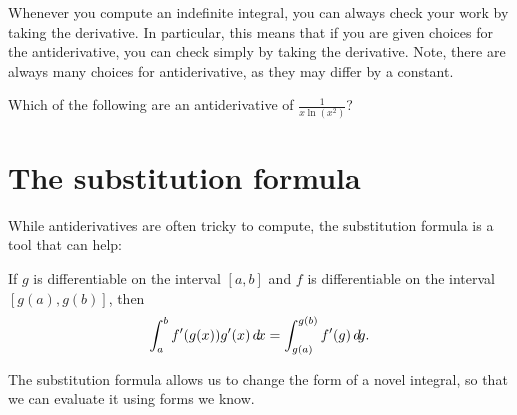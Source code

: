 \documentclass{ximera}
\begin{document}
Whenever you compute an indefinite integral, you can always check your
work by taking the derivative. In particular, this means that if you
are given choices for the antiderivative, you can check simply by
taking the derivative. Note, there are always many choices for
antiderivative, as they may differ by a constant.

\begin{question}
  Which of the following are an antiderivative of $\frac{1}{x\ln(x^2)}$?
  \begin{selectAll}
  \end{selectAll}
\end{question}

\section{The substitution formula}

While antiderivatives are often tricky to compute, the substitution
formula is a tool that can help:

\begin{theorem} 
If $g$ is differentiable on the interval $[a,b]$ and $f$ is
differentiable on the interval $[g(a),g(b)]$, then
\[
\int_a^b f'(g(x)) g'(x) \mathop{}\!d\! x =\int_{g(a)}^{g(b)} f'(g) \mathop{}\!d\! g.
\]
\end{theorem}

The substitution formula allows us to change the form of a novel
integral, so that we can evaluate it using forms we know.
\end{document}
